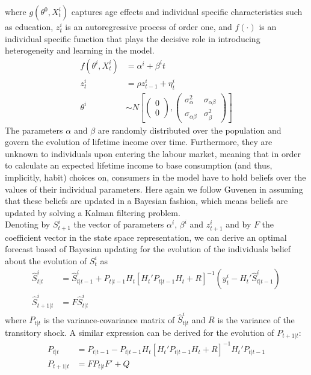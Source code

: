 where $g(\theta^0, X_t^i)$ captures age effects and individual specific 
characteristics such as education, $z_t^i$ is an autoregressive process of order
 one, and $f(\cdot)$ is an individual specific function that plays the decisive
role in introducing heterogeneity and learning in the model.
\begin{align*}
f(\theta^i, X_t^i) &= \alpha^i + \beta^i t \\
z_t^i &= \rho z_{t-1}^i + \eta_t^i \\
\theta^i &\sim N \left[ \begin{pmatrix} 0 \\ 0 \end{pmatrix}, \begin{pmatrix} \sigma_{\alpha}^2 & \sigma_{\alpha \beta} \\ \sigma_{\alpha \beta} & \sigma_{\beta}^2 \end{pmatrix} \right]
\end{align*}
The parameters $\alpha$ and $\beta$ are randomly distributed over the population 
and govern the evolution of lifetime income over time. Furthermore, they are 
unknown to individuals upon entering the labour market, meaning that in order to
 calculate an expected lifetime income to base consumption (and thus, implicitly, 
habit) choices on, consumers in the model have to hold beliefs over the values 
of their individual parameters. Here again we follow Guvenen in assuming that 
these beliefs are updated in a Bayesian fashion, which means beliefs are updated 
by solving a Kalman filtering problem. \\
Denoting by $S^i_{t+1}$ the vector of parameters $\alpha^i$, $\beta^i$ and 
$z^i_{t+1}$ and by $F$ the coefficient vector in the state space representation,
 we can derive an optimal forecast based of Bayesian updating for the evolution of 
the individuals belief about the evolution of $S^i_t$ as 
\begin{align}
\hat{S}^i_{t|t} &= \hat{S}^i_{t|t-1} + P_{t|t-1} H_t [H_t' P_{t|t-1} H_t + R]^{-1}(y_t^i - H_t' \hat{S}^i_{t|t-1}) \label{eq:KFS} \\
\hat{S}^i_{t+1|t} &= F \hat{S}^i_{t|t} \label{eq:TES}
\end{align}
where $P_{t|t}$ is the variance-covariance matrix of $\hat{S}^i_{t|t}$ and $R$ 
is the variance of the transitory shock. A similar expression can be derived for 
the evolution of $P_{t+1|t}$:
\begin{align}
P_{t|t} &= P_{t|t-1} - P_{t|t-1} H_t [ H_t' P_{t|t-1} H_t + R]^{-1} H_t' P_{t|t-1} \label{eq:KFP} \\
P_{t+1|t} &= F P_{t|t} F' + Q \label{eq:TEP}
\end{align}
